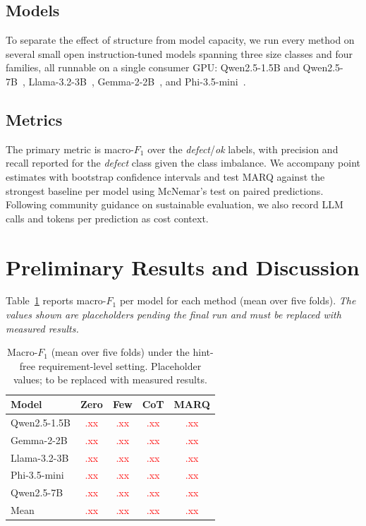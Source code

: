 \documentclass[10pt,conference]{IEEEtran}
\newcommand{\FIX}[1]{\textcolor{red}{#1}}
\begin{document}
\subsection{Models}
To separate the effect of structure from model capacity, we run every method on several small open instruction-tuned models spanning three size classes and four families, all runnable on a single consumer GPU: Qwen2.5-1.5B and Qwen2.5-7B~\cite{qwen}, Llama-3.2-3B~\cite{llama}, Gemma-2-2B~\cite{gemma}, and Phi-3.5-mini~\cite{phi}.

\subsection{Metrics}
The primary metric is macro-$F_1$ over the \emph{defect}/\emph{ok} labels, with precision and recall reported for the \emph{defect} class given the class imbalance. We accompany point estimates with bootstrap confidence intervals and test MARQ against the strongest baseline per model using McNemar's test on paired predictions. Following community guidance on sustainable evaluation, we also record LLM calls and tokens per prediction as cost context.

\section{Preliminary Results and Discussion}
\label{sec:results}
Table~\ref{tab:main} reports macro-$F_1$ per model for each method (mean over five folds). \emph{The values shown are placeholders pending the final run and must be replaced with measured results.}

\begin{table}[t]
\caption{Macro-$F_1$ (mean over five folds) under the hint-free requirement-level setting. Placeholder values; to be replaced with measured results.}
\label{tab:main}
\begin{center}
\begin{tabular}{lcccc}
\toprule
\textbf{Model} & \textbf{Zero} & \textbf{Few} & \textbf{CoT} & \textbf{MARQ} \\
\midrule
Qwen2.5-1.5B & \FIX{.xx} & \FIX{.xx} & \FIX{.xx} & \FIX{.xx} \\
Gemma-2-2B   & \FIX{.xx} & \FIX{.xx} & \FIX{.xx} & \FIX{.xx} \\
Llama-3.2-3B & \FIX{.xx} & \FIX{.xx} & \FIX{.xx} & \FIX{.xx} \\
Phi-3.5-mini & \FIX{.xx} & \FIX{.xx} & \FIX{.xx} & \FIX{.xx} \\
Qwen2.5-7B   & \FIX{.xx} & \FIX{.xx} & \FIX{.xx} & \FIX{.xx} \\
\midrule
Mean         & \FIX{.xx} & \FIX{.xx} & \FIX{.xx} & \FIX{.xx} \\
\bottomrule
\end{tabular}
\end{center}
\end{table}
\end{document}
